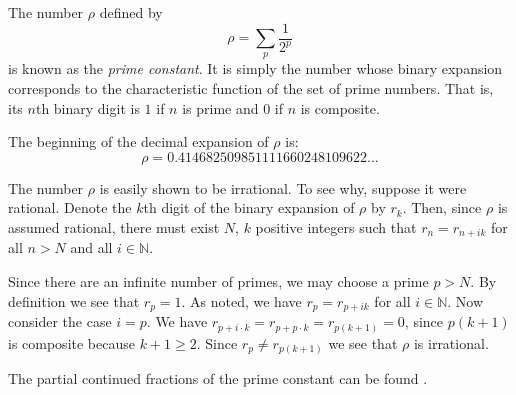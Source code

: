 \documentclass[12pt]{article}
\begin{document}
The number $\rho$ defined by 
\[ \rho = \sum_{p} \frac{1}{2^p} \]
is known as the {\sl prime constant}. It is simply the number whose binary expansion corresponds to the characteristic function of the set of prime numbers.    That is, its $n$th binary digit is $1$ if $n$ is prime and $0$ if $n$ is composite.

The beginning of the decimal expansion of $\rho$ is:
\[ \rho = 0.414682509851111660248109622... \]

The number $\rho$ is easily shown to be irrational.  To see why, suppose it were rational.  Denote the $k$th digit of the binary expansion of $\rho$ by $r_k$.  Then, since $\rho$ is assumed rational, there must exist $N$, $k$ positive integers such that $r_n=r_{n+ik}$ for all $n>N$ and all $i \in \mathbb{N}$.

Since there are an infinite number of primes, we may choose a prime $p>N$.  By definition we see that $r_p=1$.  As noted, we have $r_p=r_{p+ik}$ for all $i \in \mathbb{N}$.  Now consider the case $i=p$.  We have $r_{p+i \cdot k}=r_{p+p \cdot k}=r_{p(k+1)}=0$, since $p(k+1)$ is composite because $k+1 \geq 2$.  Since $r_p \neq r_{p(k+1)}$ we see that $\rho$ is irrational.

The partial continued fractions of the prime constant can be found .
\end{document}

